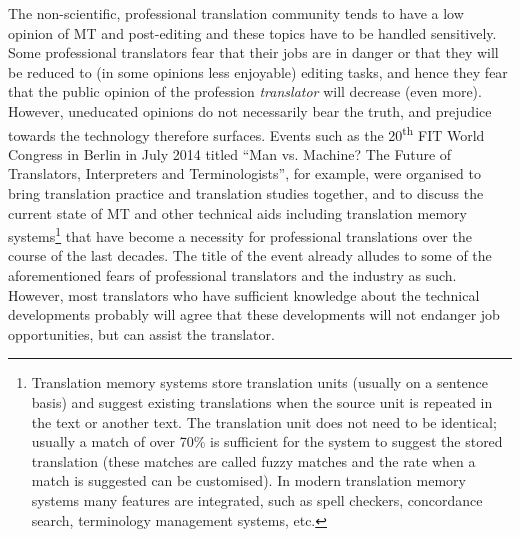 \documentclass[output=paper]{langsci/langscibook}
\begin{document}
The non-scientific, professional translation community tends to have a low opinion of MT and post-editing and these topics have to be handled sensitively. Some professional translators fear that their jobs are in danger or that they will be reduced to (in some opinions less enjoyable) editing tasks, and hence they fear that the public opinion of the profession \textit{translator} will decrease (even more). However, uneducated opinions do not necessarily bear the truth, and prejudice towards the technology therefore surfaces. Events such as the 20\textsuperscript{th} FIT World Congress in Berlin in July 2014 titled ``Man vs. Machine? The Future of Translators, Interpreters and Terminologists'', for example, were organised to bring translation practice and translation studies together, and to discuss the current state of MT and other technical aids including translation memory systems\footnote{Translation memory systems store translation units (usually on a sentence basis) and suggest existing translations when the source unit is repeated in the text or another text. The translation unit does not need to be identical; usually a match of over 70\% is sufficient for the system to suggest the stored translation (these matches are called fuzzy matches and the rate when a match is suggested can be customised). In modern translation memory systems many features are integrated, such as spell checkers, concordance search, terminology management systems, etc.} that have become a necessity for professional translations over the course of the last decades. The title of the event already alludes to some of the aforementioned fears of professional translators and the industry as such. However, most translators who have sufficient knowledge about the technical developments probably will agree that these developments will not endanger job opportunities, but can assist the translator.
\end{document}
